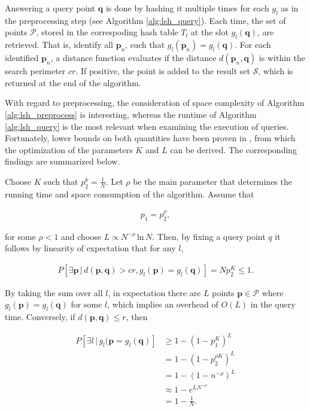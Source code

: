 \documentclass[../../../main.tex]{subfiles}
\begin{document}
 Answering a query point $\bm{q}$ is done by hashing it multiple times for each $g_l$ as in the preprocessing step (see Algorithm \ref{alg:lsh_query}). Each time, the set of points $\mathcal{P}$, stored in the correspoding hash table $T_l$ at the slot $g_l(\bm{q})$, are retrieved. That is, identify all $\bm{p}_n$, such that $g_l(\bm{p}_n) = g_l(\bm{q})$. For each identified $\bm{p}_n$, a distance function evaluates if the distance $d(\bm{p}_n, \bm{q})$ is within the search perimeter $cr$. If positive, the point is added to the result set $\mathcal{S}$, which is returned at the end of the algorithm.

 With regard to preprocessing, the consideration of space complexity of Algorithm \ref{alg:lsh_preprocess} is interesting, whereas the runtime of Algorithm \ref{alg:lsh_query} is the most relevant when examining the execution of queries. Fortunately, lower bounds on both quantities have been proven in \cite{motwani2006lower}, from which the optimization of the parameters $K$ and $L$ can be derived. The corresponding findings are summarized below.

 Choose $K$ such that $p_2^k = \frac{1}{N}$. Let $\rho$ be the main parameter that determines the running time and space consumption of the algorithm. Assume that

\begin{align*}
    p_1 = p_2^\rho,
\end{align*}

for some $\rho < 1$ and choose $L \propto N ^{-\rho} \, \text{ln} \, N$. Then, by fixing a query point $q$ it follows by linearity of expectation that for any $l$,

\begin{align*}
    P[\exists \bm{p} \, | \, d(\bm{p}, \bm{q}) > cr, g_l(\bm{p}) = g_l(\bm{q})] = N p_2^K \leq 1.
\end{align*}

By taking the sum over all $l$, in expectation there are $L$ points $\bm{p} \in \mathcal{P}$ where $g_l(\bm{p}) = g_l(\bm{q})$ for some $l$, which implies an overhead of $O(L)$ in the query time. Conversely, if $d(\bm{p}, \bm{q}) \leq r$, then

\begin{align*}
    P[\exists l \, | \, g_l(\bm{p} = g_l(\bm{q})] &\geq 1 - (1-p_1^K)^L \\
                                                  &= 1-(1-p_2^{\rho K})^L \\
                                                  &= 1-(1-n^{-\rho})^L \\
                                                  &\approx 1-e^{LN^{-\rho}} \\
                                                  &= 1 - \frac{1}{N}.
\end{align*}
\end{document}
